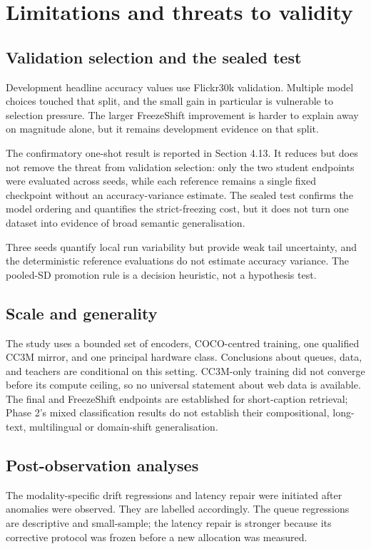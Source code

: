 \chapter{Limitations and threats to validity}
\section{Validation selection and the sealed test}
Development headline accuracy values use Flickr30k validation. Multiple model choices touched that split, and the small \MTone{} gain in particular is vulnerable to selection pressure. The larger FreezeShift improvement is harder to explain away on magnitude alone, but it remains development evidence on that split.

The confirmatory one-shot result is reported in Section 4.13. It reduces but does not remove the threat from validation selection: only the two student endpoints were evaluated across seeds, while each reference remains a single fixed checkpoint without an accuracy-variance estimate. The sealed test confirms the model ordering and quantifies the strict-freezing cost, but it does not turn one dataset into evidence of broad semantic generalisation.

Three seeds quantify local run variability but provide weak tail uncertainty, and the deterministic reference evaluations do not estimate accuracy variance. The pooled-SD promotion rule is a decision heuristic, not a hypothesis test.

\section{Scale and generality}
The study uses a bounded set of encoders, COCO-centred training, one qualified CC3M mirror, and one principal hardware class. Conclusions about queues, data, and teachers are conditional on this setting. CC3M-only training did not converge before its compute ceiling, so no universal statement about web data is available. The final \MTone{} and FreezeShift endpoints are established for short-caption retrieval; Phase 2's mixed classification results do not establish their compositional, long-text, multilingual or domain-shift generalisation.

\section{Post-observation analyses}
The modality-specific drift regressions and latency repair were initiated after anomalies were observed. They are labelled accordingly. The queue regressions are descriptive and small-sample; the latency repair is stronger because its corrective protocol was frozen before a new allocation was measured.

